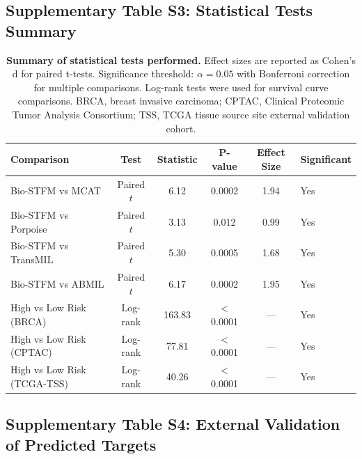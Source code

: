 \documentclass[11pt,a4paper]{article}
\begin{document}
\newpage

\subsection{Supplementary Table S3: Statistical Tests Summary}

\begin{table}[H]
\centering
\small
\caption{\textbf{Summary of statistical tests performed.} Effect sizes are reported as Cohen's d for paired t-tests. Significance threshold: $\alpha = 0.05$ with Bonferroni correction for multiple comparisons. Log-rank tests were used for survival curve comparisons. BRCA, breast invasive carcinoma; CPTAC, Clinical Proteomic Tumor Analysis Consortium; TSS, TCGA tissue source site external validation cohort.}
\label{tab:s3_statistics}
\begin{tabular}{@{}lccccl@{}}
\toprule
\textbf{Comparison} & \textbf{Test} & \textbf{Statistic} & \textbf{P-value} & \textbf{Effect Size} & \textbf{Significant} \\
\midrule
Bio-STFM vs MCAT & Paired $t$ & 6.12 & 0.0002 & 1.94 & Yes \\
\addlinespace[0.5ex]
Bio-STFM vs Porpoise & Paired $t$ & 3.13 & 0.012 & 0.99 & Yes \\
\addlinespace[0.5ex]
Bio-STFM vs TransMIL & Paired $t$ & 5.30 & 0.0005 & 1.68 & Yes \\
\addlinespace[0.5ex]
Bio-STFM vs ABMIL & Paired $t$ & 6.17 & 0.0002 & 1.95 & Yes \\
\addlinespace[0.5ex]
High vs Low Risk (BRCA) & Log-rank & 163.83 & $<$ 0.0001 & --- & Yes \\
\addlinespace[0.5ex]
High vs Low Risk (CPTAC) & Log-rank & 77.81 & $<$ 0.0001 & --- & Yes \\
\addlinespace[0.5ex]
High vs Low Risk (TCGA-TSS) & Log-rank & 40.26 & $<$ 0.0001 & --- & Yes \\
\bottomrule
\end{tabular}
\end{table}

\newpage

\subsection{Supplementary Table S4: External Validation of Predicted Targets}
\end{document}
